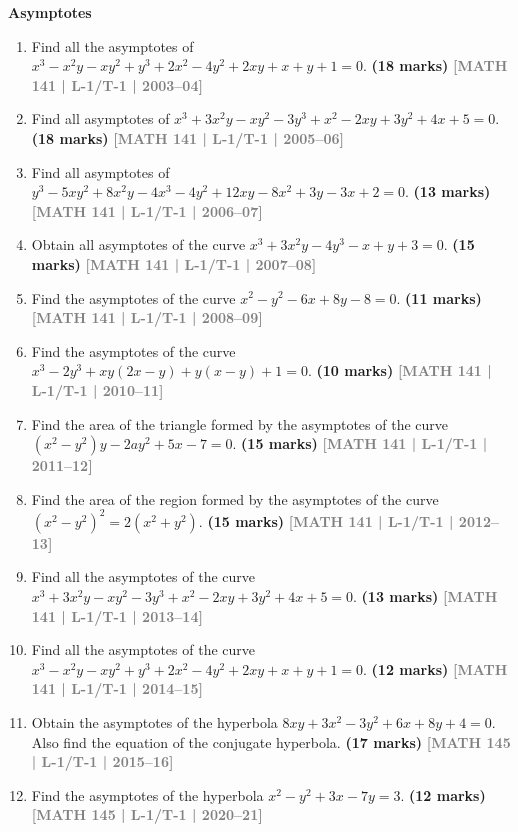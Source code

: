 \documentclass[12pt,a4paper]{article}
\newcommand{\yr}[1]{\hfill\textcolor{gray}{\small\textbf{[#1]}}}
\newcommand{\mk}[1]{\textcolor{orange!70!black}{\small\textbf{(#1 marks)}}}
\newcommand{\subtopic}[2]{%
  \vspace{10pt}
  \noindent\begin{tcolorbox}[colback=#1!8,colframe=#1,boxrule=0.6pt,arc=4pt,
    left=6pt,right=6pt,top=4pt,bottom=4pt]
    \small\bfseries\textcolor{#1}{#2}
  \end{tcolorbox}
  \vspace{2pt}
}
\begin{document}
\subtopic{cA}{Asymptotes}
\label{sub:s1-asymptotes}

\begin{enumerate}

\item Find all the asymptotes of $x^{3}-x^{2}y-xy^{2}+y^{3}+2x^{2}-4y^{2}+2xy+x+y+1=0$.
\mk{18} \yr{MATH 141 | L-1/T-1 | 2003--04}


\item Find all asymptotes of $x^{3}+3x^{2}y-xy^{2}-3y^{3}+x^{2}-2xy+3y^{2}+4x+5=0$.
\mk{18} \yr{MATH 141 | L-1/T-1 | 2005--06}

\item Find all asymptotes of $y^{3}-5xy^{2}+8x^{2}y-4x^{3}-4y^{2}+12xy-8x^{2}+3y-3x+2=0$.
\mk{13} \yr{MATH 141 | L-1/T-1 | 2006--07}

\item Obtain all asymptotes of the curve $x^{3}+3x^{2}y-4y^{3}-x+y+3=0$.
\mk{15} \yr{MATH 141 | L-1/T-1 | 2007--08}

\item Find the asymptotes of the curve $x^{2}-y^{2}-6x+8y-8=0$.
\mk{11} \yr{MATH 141 | L-1/T-1 | 2008--09}

\item Find the asymptotes of the curve $x^{3}-2y^{3}+xy(2x-y)+y(x-y)+1=0$.
\mk{10} \yr{MATH 141 | L-1/T-1 | 2010--11}

\item Find the area of the triangle formed by the asymptotes of the curve $(x^{2}-y^{2})y-2ay^{2}+5x-7=0$.
\mk{15} \yr{MATH 141 | L-1/T-1 | 2011--12}

\item Find the area of the region formed by the asymptotes of the curve $(x^{2}-y^{2})^{2}=2(x^{2}+y^{2})$.
\mk{15} \yr{MATH 141 | L-1/T-1 | 2012--13}

\item Find all the asymptotes of the curve $x^{3}+3x^{2}y-xy^{2}-3y^{3}+x^{2}-2xy+3y^{2}+4x+5=0$.
\mk{13} \yr{MATH 141 | L-1/T-1 | 2013--14}

\item Find all the asymptotes of the curve $x^{3}-x^{2}y-xy^{2}+y^{3}+2x^{2}-4y^{2}+2xy+x+y+1=0$.
\mk{12} \yr{MATH 141 | L-1/T-1 | 2014--15}

\item Obtain the asymptotes of the hyperbola $8xy+3x^{2}-3y^{2}+6x+8y+4=0$. Also find the equation of the conjugate hyperbola.
\mk{17} \yr{MATH 145 | L-1/T-1 | 2015--16}

\item Find the asymptotes of the hyperbola $x^{2}-y^{2}+3x-7y=3$.
\mk{12} \yr{MATH 145 | L-1/T-1 | 2020--21}


\end{enumerate}
\end{document}

